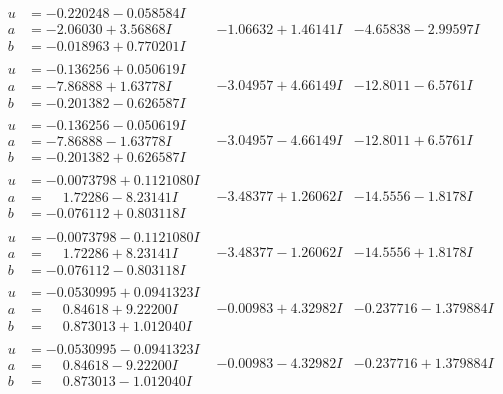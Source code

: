 \documentclass[1p]{elsarticle_modified}
\theoremstyle{definition}
\begin{document}
$$\begin{array}{c|c|c}
\begin{aligned}
u &= -0.220248 - 0.058584 I \\
a &= -2.06030 + 3.56868 I \\
b &= -0.018963 + 0.770201 I\end{aligned}
 & -1.06632 + 1.46141 I & -4.65838 - 2.99597 I \\ \hline\begin{aligned}
u &= -0.136256 + 0.050619 I \\
a &= -7.86888 + 1.63778 I \\
b &= -0.201382 - 0.626587 I\end{aligned}
 & -3.04957 + 4.66149 I & -12.8011 - 6.5761 I \\ \hline\begin{aligned}
u &= -0.136256 - 0.050619 I \\
a &= -7.86888 - 1.63778 I \\
b &= -0.201382 + 0.626587 I\end{aligned}
 & -3.04957 - 4.66149 I & -12.8011 + 6.5761 I \\ \hline\begin{aligned}
u &= -0.0073798 + 0.1121080 I \\
a &= \phantom{-}1.72286 - 8.23141 I \\
b &= -0.076112 + 0.803118 I\end{aligned}
 & -3.48377 + 1.26062 I & -14.5556 - 1.8178 I \\ \hline\begin{aligned}
u &= -0.0073798 - 0.1121080 I \\
a &= \phantom{-}1.72286 + 8.23141 I \\
b &= -0.076112 - 0.803118 I\end{aligned}
 & -3.48377 - 1.26062 I & -14.5556 + 1.8178 I \\ \hline\begin{aligned}
u &= -0.0530995 + 0.0941323 I \\
a &= \phantom{-}0.84618 + 9.22200 I \\
b &= \phantom{-}0.873013 + 1.012040 I\end{aligned}
 & -0.00983 + 4.32982 I & -0.237716 - 1.379884 I \\ \hline\begin{aligned}
u &= -0.0530995 - 0.0941323 I \\
a &= \phantom{-}0.84618 - 9.22200 I \\
b &= \phantom{-}0.873013 - 1.012040 I\end{aligned}
 & -0.00983 - 4.32982 I & -0.237716 + 1.379884 I \\ \hline\begin{aligned}

\end{aligned}
\end{array}$$
\end{document}
